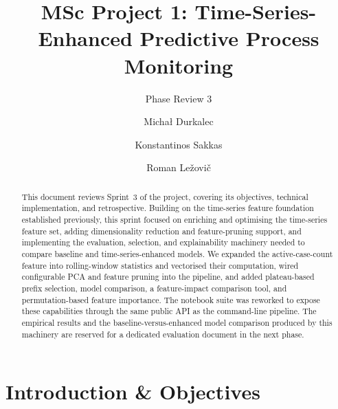 \documentclass[runningheads]{llncs}
\begin{document}
\title{MSc Project 1: Time-Series-Enhanced Predictive Process Monitoring}
\subtitle{Phase Review 3}
\author{Michał Durkalec \and
    Konstantinos Sakkas \and
    Roman Ležovič
}
\maketitle
\begin{abstract}
    This document reviews Sprint~3 of the project, covering its objectives, technical
    implementation, and retrospective. Building on the time-series feature foundation
    established previously, this sprint focused on enriching and optimising the
    time-series feature set, adding dimensionality reduction and feature-pruning support,
    and implementing the evaluation, selection, and explainability machinery needed to
    compare baseline and time-series-enhanced models. We expanded the active-case-count
    feature into rolling-window statistics and vectorised their computation, wired
    configurable PCA and feature pruning into the pipeline, and added plateau-based prefix
    selection, model comparison, a feature-impact comparison tool, and permutation-based
    feature importance. The notebook suite was reworked to expose these capabilities through
    the same public API as the command-line pipeline. The empirical results and the
    baseline-versus-enhanced model comparison produced by this machinery are reserved for a
    dedicated evaluation document in the next phase.
\end{abstract}

\section{Introduction \& Objectives}
\end{document}
